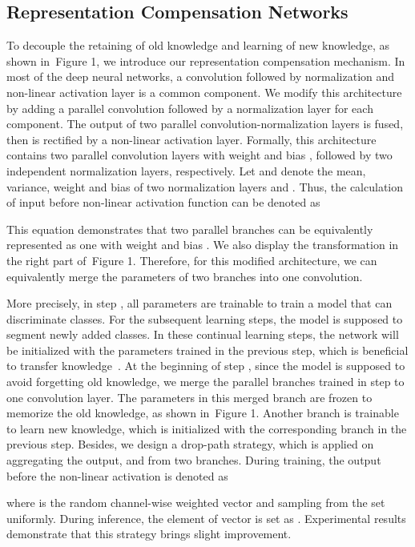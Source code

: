 \documentclass[10pt,twocolumn,letterpaper]{article}
\newcommand{\figref}[1]{Figure 1}\newcommand{\tabref}[1]{Table 1}\newcommand{\secref}[1]{Section 1}
\newcommand{\figref}[1]{Fig.~\ref{#1}}\newcommand{\tabref}[1]{Tab.~\ref{#1}}\newcommand{\secref}[1]{Sec.~\ref{#1}}
\begin{document}
\subsection{Representation Compensation Networks}\label{sec:rcnet}


To decouple the retaining of old knowledge and learning of new knowledge, as shown in~\figref{fig:method},
we introduce our representation compensation mechanism.
In most of the deep neural networks,
a  convolution followed by normalization and non-linear activation layer is a common component.
We modify this architecture by adding a parallel  convolution followed by a normalization layer for each component.
The output of two parallel convolution-normalization
layers is fused,
then is rectified by a non-linear activation layer. 
Formally, this architecture contains two parallel convolution layers
with weight  and bias , followed by two independent normalization layers, respectively.
Let 
and 
denote the mean, variance, weight and bias of two normalization layers  and .
Thus,
the calculation of input  before non-linear activation function can be denoted as  

This equation demonstrates that two parallel branches can be equivalently represented as one with weight  and bias .
We also display the transformation in the right part of~\figref{fig:method}.
Therefore,
for this modified architecture,
we can equivalently merge the parameters of two branches into
one convolution.


More precisely, in step ,
all parameters are trainable to train a model that can discriminate  classes.
For the subsequent learning steps,
the model is supposed to segment newly added classes.
In these continual learning steps,
the network will be initialized with the parameters trained
in the previous step,
which is beneficial to transfer knowledge~\cite{mib}.
At the beginning of step ,
since the model is supposed to avoid forgetting old knowledge,
we merge the parallel branches trained in step  to one convolution layer.
The parameters in this merged branch are frozen to memorize
the old knowledge,
as shown in~\figref{fig:method}.
Another branch is trainable to learn new knowledge,
which is initialized with the corresponding
branch in the previous step.
Besides,
we design a drop-path strategy,
which is applied on aggregating the output,   and  from two branches.
During training,
the output before the non-linear activation is denoted as 

where  is the random channel-wise weighted vector and sampling from the set  uniformly.
During inference,
the element of vector  is set as .
Experimental results demonstrate that this strategy brings slight improvement.
\end{document}

